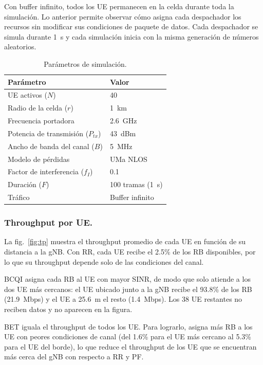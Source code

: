 Con buffer infinito, todos los UE permanecen en la celda durante toda la
simulación. Lo anterior permite observar cómo asigna cada despachador los
recursos sin modificar sus condiciones de paquete de datos. Cada
despachador se simula durante 1~s y cada simulación inicia con la misma 
generación de números aleatorios.

\begin{table}[tb]
\centering
\caption{Parámetros de simulación.}
\label{tab:parametros}
\footnotesize
\begin{tabular}{ll}
\hline
Parámetro & Valor \\
\hline
UE activos ($N$) & 40 \\
Radio de la celda ($r$) & 1~km \\
Frecuencia portadora & 2.6~GHz \\
Potencia de transmisión ($P_{tx}$) & 43~dBm \\
Ancho de banda del canal ($B$) & 5~MHz \\
Modelo de pérdidas & UMa NLOS \\
Factor de interferencia ($f_I$) & 0.1 \\
Duración ($F$) & 100 tramas (1~s) \\
Tráfico & Buffer infinito \\
\hline
\end{tabular}
\end{table}

\subsubsection{Throughput por UE.}\label{subsec:res_tp}

La fig.~\ref{fig:tp} muestra el throughput promedio de cada UE en función
de su distancia a la gNB. Con RR, cada UE recibe
el 2.5\% de los RB disponibles, por lo que su throughput depende solo de
las condiciones del canal.

BCQI asigna cada RB al UE con mayor SINR, de modo que solo atiende a los
dos UE más cercanos: el UE ubicado junto a la gNB recibe el 93.8\%
de los RB (21.9~Mbps) y el UE a 25.6~m el resto (1.4~Mbps). Los 38 UE
restantes no reciben datos y no aparecen en la figura.

BET iguala el throughput de todos los UE. Para lograrlo, asigna más RB 
a los UE con peores condiciones de canal (del 1.6\% para el UE más
cercano al 5.3\% para el UE del borde), lo que reduce el throughput de los
UE que se encuentran más cerca del gNB con respecto a RR y PF.

